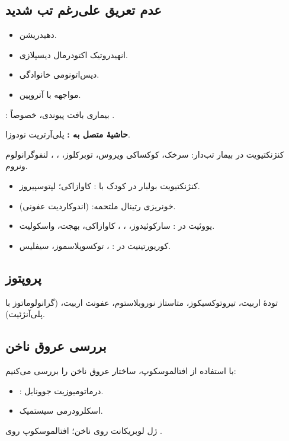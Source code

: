 \documentclass[12pt,a4paper]{article}
\begin{document}
\subsection*{عدم تعریق علی‌رغم تب شدید}
\begin{itemize}
\item دهیدریشن.
\item انهیدروتیک اکتودرمال دیسپلازی.
\item دیس‌اتونومی خانوادگی.
\item مواجهه با آتروپین.
\end{itemize}

: بیماری بافت پیوندی، خصوصاً .

\textbf{حاشیهٔ متصل به :} پلی‌آرتریت نودوزا.

کنژنکتیویت  در بیمار تب‌دار: سرخک، کوکساکی ویروس، توبرکلوز، ، ، لنفوگرانولوم ونروم.

\begin{itemize}
\item کنژنکتیویت بولبار در کودک با : کاوازاکی؛ لپتوسپیروز.
\item خونریزی رتینال ملتحمه:  (اندوکاردیت عفونی).
\item یووئیت در : سارکوئیدوز، ، ، کاوازاکی، بهجت، واسکولیت.
\item کوریورتینیت در : ، توکسوپلاسموز، سیفلیس.
\end{itemize}

\subsection*{پروپتوز}
تودهٔ اربیت، تیروتوکسیکوز، متاستاز نوروبلاستوم، عفونت اربیت،  (گرانولوماتوز با پلی‌آنژئیت).

\subsection*{بررسی عروق ناخن}
با استفاده از افتالموسکوپ، ساختار عروق ناخن را بررسی می‌کنیم:
\begin{itemize}
\item {}: درماتومیوزیت جوونایل.
\item اسکلرودرمی سیستمیک.
\end{itemize}
ژل لوبریکانت روی ناخن؛ افتالموسکوپ روی .
\end{document}
